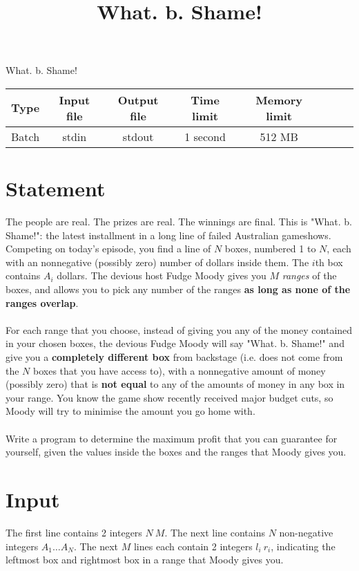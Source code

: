 \documentclass{article}
\title{\vspace{-3ex}What. b. Shame!}
\begin{document}
\author{\vspace{-5ex}}
\date{\vspace{-5ex}}
\pagestyle{fancy}
\fancyhf{}
\begin{center}
\huge{What. b. Shame!}\small\\
\vspace{5ex}
\begin{tabular}{l*{6}{c}r}
Type & Input file& Output file & Time limit & Memory limit\\
\hline
Batch & stdin & stdout & 1 second & 512 MB
\end{tabular}
\end{center}
\section*{Statement}

The people are real. The prizes are real. The winnings are final. This is "What. b. Shame!": the latest installment in a long line of failed Australian gameshows. Competing on today's episode, you find a line of $N$ boxes, numbered 1 to $N$, each with an nonnegative (possibly zero) number of dollars inside them. The $i$th box contains $A_i$ dollars. The devious host Fudge Moody gives you $M$ \textit{ranges} of the boxes, and allows you to pick any number of the ranges \textbf{as long as none of the ranges overlap}. \\
\\ For each range that you choose, instead of giving you any of the money contained in your chosen boxes, the devious Fudge Moody will say "What. b. Shame!" and give you a \textbf{completely different box} from backstage (i.e. does not come from the $N$ boxes that you have access to), with a nonnegative amount of money (possibly zero) that is \textbf{not equal} to any of the amounts of money in any box in your range. You know the game show recently received major budget cuts, so Moody will try to minimise the amount you go home with. \\
\\ Write a program to determine the maximum profit that you can guarantee for yourself, given the values inside the boxes and the ranges that Moody gives you.
\section*{Input}
The first line contains 2 integers $N\ M$. The next line contains $N$ non-negative integers $A_1 \ldots A_N$. The next $M$ lines each contain 2 integers $l_i\ r_i$, indicating the leftmost box and rightmost box in a range that Moody gives you.
\end{document}
